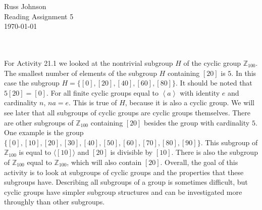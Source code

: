 \documentclass[11pt,a4paper]{article}
\begin{document}
\begin{flushright}
Russ Johnson\\
Reading Assignment 5\\
\today\\
\end{flushright}
~\\
~\\

For Activity 21.1 we looked at the nontrivial subgroup $H$ of the cyclic group $\mathbb{Z}_{100}$. The smallest number of elements of the subgroup $H$ containing $[20]$ is $5$. In this case the subgroup $H=\{[0],[20],[40],[60],[80]\}$. It should be noted that $5[20]=[0]$. For all finite cyclic groups equal to $\left\langle a \right\rangle$ with identity $e$ and cardinality $n$, $na=e$. This is true of $H$, because it is also a cyclic group. We will see later that all subgroups of cyclic groups are cyclic groups themselves. There are other subgroups of $\mathbb{Z}_{100}$ containing $[20]$ besides the group with cardinality $5$. One example is the group $\{[0],[10],[20],[30],[40],[50],[60],[70],[80],[90]\}$. This subgroup of $\mathbb{Z}_{100}$ is equal to $\langle [10]\rangle$ and $[20]$ is divisible by $[10]$. There is also the subgroup of $\mathbb{Z}_{100}$ equal to $\mathbb{Z}_{100}$, which will also contain $[20]$. Overall, the goal of this activity is to look at subgroups of cyclic groups and the properties that these subgroups have. Describing all subgroups of a group is sometimes difficult, but cyclic groups have simpler subgroup structures and can be investigated more throughly than other subgroups.
\end{document}
